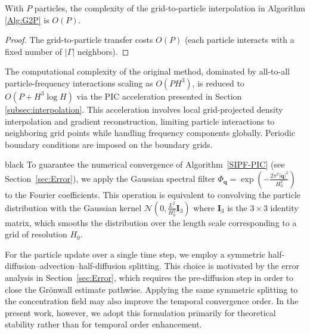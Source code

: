 \documentclass[review,onefignum,onetabnum]{siamart250211}
\begin{document}
\begin{lemma}
With $P$ particles, the complexity of the grid-to-particle interpolation in Algorithm \ref{Alg:G2P} is \( O(P) \).
\end{lemma}
\begin{proof}
The grid-to-particle transfer costs \( O(P) \) (each particle interacts with a fixed number of \(|\Gamma|\) neighbors).
\end{proof}

The computational complexity of the original method, dominated by all-to-all particle-frequency interactions scaling as \(O(P H^3)\), is reduced to \(O(P + H^3 \log H)\) via the PIC acceleration presented in Section \ref{subsec:interpolation}. This acceleration involves local grid-projected density interpolation and gradient reconstruction, limiting particle interactions to neighboring grid points while handling frequency components globally. Periodic boundary conditions are imposed on the boundary grids. \begin{color}{black} To guarantee the numerical convergence of Algorithm~\ref{SIPF-PIC} (see Section~\ref{sec:Error}), we apply the Gaussian spectral filter $\Phi_{\mathbf q}=\exp\left(-\frac{2\pi ^2|\mathbf q|^2}{H_0^2}\right)$ to the Fourier coefficients. This operation is equivalent to convolving the particle distribution with the Gaussian kernel $\mathcal N\left(0,\frac{L^2}{H_0^2}\mathbf I_3\right)$ where \( \mathbf{I}_3 \) is the \( 3 \times 3 \) identity matrix, which smooths the distribution over the length scale corresponding to a grid of resolution $H_0$.

For the particle update over a single time step, we employ a symmetric
half-diffusion--advection--half-diffusion splitting. This choice is motivated
by the error analysis in Section~\ref{sec:Error}, which requires the pre-diffusion step in
order to close the Grönwall estimate pathwise. Applying the same symmetric
splitting to the concentration field may also improve the temporal
convergence order. In the present work, however, we adopt this formulation
primarily for theoretical stability rather than for temporal order
enhancement.
\end{color}
\end{document}
